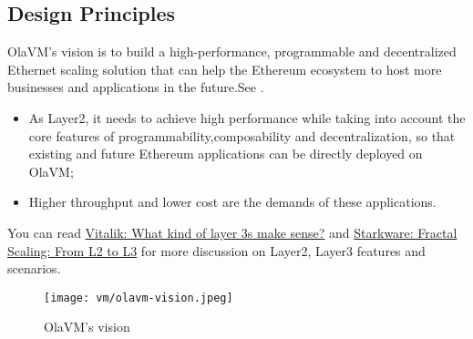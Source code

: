 \subsection{Design Principles} \label{sec:design-principles-2}

OlaVM's vision is to build a high-performance, programmable and decentralized Ethernet scaling solution that can help the Ethereum ecosystem to
host more businesses and applications in the future.See .
\begin{itemize}
    \item As Layer2, it needs to achieve high performance while taking into account the core features of programmability,composability and
          decentralization, so that existing and future Ethereum applications can be directly deployed on OlaVM;
    \item Higher throughput and lower cost are the demands of these applications.
\end{itemize}
You can read \href{https://vitalik.ca/general/2022/09/17/layer_3.html}{Vitalik: What kind of layer 3s make sense?} and
\href{https://medium.com/starkware/fractal-scaling-from-l2-to-l3-7fe238ecfb4f}{Starkware: Fractal Scaling: From L2 to L3} for more discussion
on Layer2, Layer3 features and scenarios.

\begin{figure}[!ht]
    \centering
    \texttt{[image: vm/olavm-vision.jpeg]}
    \caption{OlaVM's vision}
    \label{fig:olavm-vision}
\end{figure}





